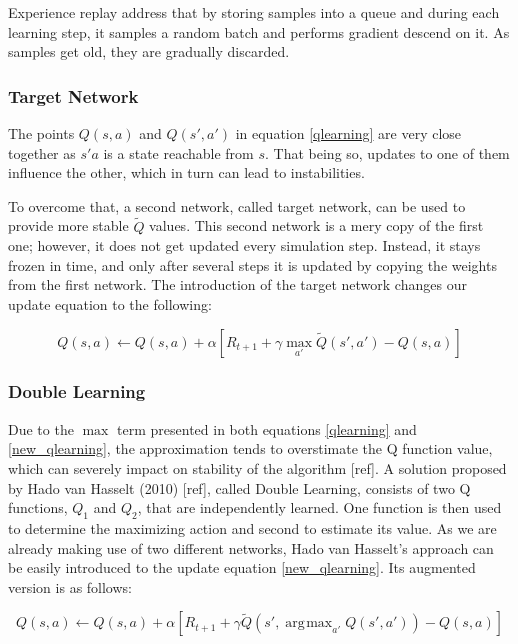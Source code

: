 \documentclass[11pt,twoside]{article}
\DeclareMathOperator*{\argmax}{\arg\!\max}
\begin{document}
Experience replay address that by storing samples into a queue and during each learning step, it samples a random batch and performs gradient descend on it. As samples get old, they are gradually discarded.

\subsubsection{Target Network}

The points $Q(s, a)$ and $Q(s', a')$ in equation \ref{qlearning} are very close together as $s'a$ is a state reachable from $s$. That being so, updates to one of them influence the other, which in turn can lead to instabilities.

To overcome that, a second network, called target network, can be used to provide more stable $\widetilde{Q}$ values. This second network is a mery copy of the first one; however, it does not get updated every simulation step. Instead, it stays frozen in time, and only after several steps it is updated by copying the weights from the first network. The introduction of the target network changes our update equation to the following:

\begin{equation} \label{new_qlearning}
	Q(s, a) \leftarrow Q(s, a) + \alpha [R_{t+1} + \gamma \max_{a'}\widetilde{Q}(s', a') - Q(s,a)]
\end{equation}


\subsubsection{Double Learning}\label{double_learning}

Due to the $\max$ term presented in both equations \ref{qlearning} and \ref{new_qlearning}, the approximation tends to overstimate the Q function value, which can severely impact on stability of the algorithm [ref]. A solution proposed by Hado van Hasselt (2010) [ref], called Double Learning, consists of two Q functions, $Q_1$ and $Q_2$, that are independently learned. One function is then used to determine the maximizing action and second to estimate its value. As we are already making use of two different networks, Hado van Hasselt's approach can be easily introduced to the update equation \ref{new_qlearning}. Its augmented version is as follows:

\begin{equation}\label{double_equation}
	Q(s, a) \leftarrow Q(s, a) + \alpha [R_{t+1} + \gamma \widetilde{Q}(s', \argmax_{a'}{Q(s', a')}) - Q(s,a)]
\end{equation}
\end{document}
